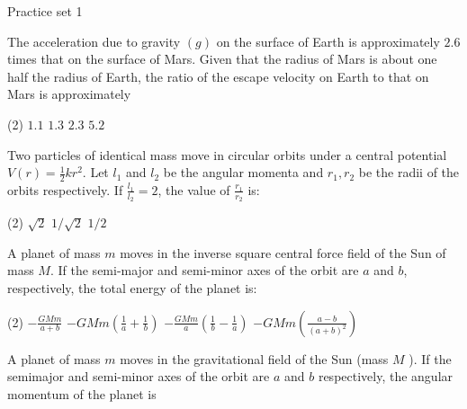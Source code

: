  
 \newpage
 \begin{abox}
 	Practice set 1
 	\end{abox}
 \begin{enumerate}
 	\begin{minipage}{\textwidth}
 	\item The acceleration due to gravity $(g)$ on the surface of Earth is approximately $2.6$ times that on the surface of Mars. Given that the radius of Mars is about one half the radius of Earth, the ratio of the escape velocity on Earth to that on Mars is approximately
 \end{minipage}
 \begin{tasks}(2)
 	\task[\textbf{A.}] $1.1$
 	\task[\textbf{B.}]$1.3$
 	\task[\textbf{C.}]$2.3$
 	\task[\textbf{D.}]$5.2$
 \end{tasks}
\begin{minipage}{\textwidth}
	\item Two particles of identical mass move in circular orbits under a central potential $V(r)=\frac{1}{2} k r^{2}$. Let $l_{1}$ and $l_{2}$ be the angular momenta and $r_{1}, r_{2}$ be the radii of the orbits respectively. If $\frac{l_{1}}{l_{2}}=2$, the value of $\frac{r_{1}}{r_{2}}$ is:
\end{minipage}
\begin{tasks}(2)
	\task[\textbf{A.}] $\sqrt{2}$
	\task[\textbf{B.}]$1 / \sqrt{2}$
	\task[\textbf{D.}] $1 / 2$
\end{tasks}
\begin{minipage}{\textwidth}
	\item A planet of mass $m$ moves in the inverse square central force field of the Sun of mass $M$. If the semi-major and semi-minor axes of the orbit are $a$ and $b$, respectively, the total energy of the planet is:
\end{minipage}
\begin{tasks}(2)
	\task[\textbf{A.}] $-\frac{G M m}{a+b}$
	\task[\textbf{B.}]$-G M m\left(\frac{1}{a}+\frac{1}{b}\right)$
	\task[\textbf{C.}]$-\frac{G M m}{a}\left(\frac{1}{b}-\frac{1}{a}\right)$
	\task[\textbf{D.}]$-G M m\left(\frac{a-b}{(a+b)^{2}}\right)$
\end{tasks}
\begin{minipage}{\textwidth}
	\item A planet of mass $m$ moves in the gravitational field of the Sun (mass $M$ ). If the semimajor and semi-minor axes of the orbit are $a$ and $b$ respectively, the angular momentum of the planet is

\end{minipage}
\end{enumerate}
